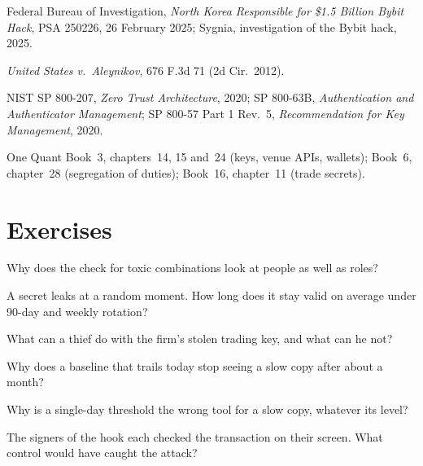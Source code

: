 \begin{omsources}
\item Federal Bureau of Investigation, \emph{North Korea Responsible for \$1.5 Billion Bybit Hack}, PSA 250226, 26 February 2025; Sygnia,
investigation of the Bybit hack, 2025.
\item \emph{United States v.\ Aleynikov}, 676 F.3d 71 (2d Cir.\ 2012).
\item NIST SP 800-207, \emph{Zero Trust Architecture}, 2020; SP 800-63B, \emph{Authentication and Authenticator Management}; SP 800-57 Part 1
Rev.~5, \emph{Recommendation for Key Management}, 2020.
\item One Quant Book~3, chapters~14, 15 and~24 (keys, venue APIs, wallets); Book~6, chapter~28 (segregation of duties); Book~16, chapter~11
(trade secrets).
\end{omsources}

\section{Exercises}

\begin{exercise}[$\star$]\label{exo:pl:security:1}
Why does the check for toxic combinations look at people as well as roles?
\end{exercise}

\begin{exercise}[$\star$]\label{exo:pl:security:2}
A secret leaks at a random moment. How long does it stay valid on average under 90-day and weekly rotation?
\end{exercise}

\begin{exercise}[$\star$]\label{exo:pl:security:3}
What can a thief do with the firm's stolen trading key, and what can he not?
\end{exercise}

\begin{exercise}[$\star\star$]\label{exo:pl:security:4}
Why does a baseline that trails today stop seeing a slow copy after about a month?
\end{exercise}

\begin{exercise}[$\star\star$]\label{exo:pl:security:5}
Why is a single-day threshold the wrong tool for a slow copy, whatever its level?
\end{exercise}

\begin{exercise}[$\star\star$]\label{exo:pl:security:6}
The signers of the hook each checked the transaction on their screen. What control would have caught the attack?
\end{exercise}

